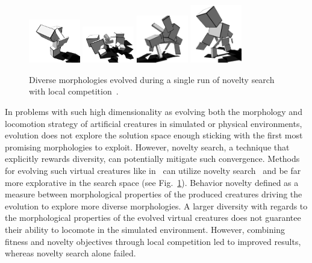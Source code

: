 \begin{figure}[t!]
\centering
\includegraphics[width=0.2\textwidth]{../Figures/Misc/nov1.png}
\includegraphics[width=0.2\textwidth]{../Figures/Misc/nov2.png}
\includegraphics[width=0.2\textwidth]{../Figures/Misc/nov3.png}
\includegraphics[width=0.2\textwidth]{../Figures/Misc/nov4.png}
\caption{Diverse morphologies evolved during a single run of novelty search with local competition~\citep{lehman2011evolving}.}
\label{fig:noveltySims}
\end{figure}

In problems with such high dimensionality as evolving both the morphology and locomotion strategy of artificial creatures in simulated or physical environments, evolution does not explore the solution space enough sticking with the first most promising morphologies to exploit. However, novelty search, a technique that explicitly rewards diversity, can potentially mitigate such convergence. Methods for evolving such virtual creatures like in~\citep{sims1994evolving} can utilize novelty search~\citep{lehman2011evolving} and be far more explorative in the search space (see Fig.~\ref{fig:noveltySims}). Behavior novelty defined as a measure between morphological properties of the produced creatures driving the evolution to explore more diverse morphologies. A larger diversity with regards to the morphological properties of the evolved virtual creatures does not guarantee their ability to locomote in the simulated environment. However, combining fitness and novelty objectives through local competition led to improved results, whereas novelty search alone failed. 


